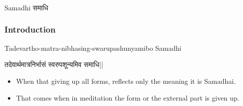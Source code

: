 \begin{frame}[fragile]\frametitle{}
\begin{center}
{\Large Samadhi समाधि}
\end{center}
\end{frame}

\begin{frame}[fragile]\frametitle{Introduction}

Tadevartho-matra-nibhasing-swarupashunyamibo Samadhi

तदेवार्थमात्रनिर्भासं स्वरुपशून्यमिव समाधि||

	\begin{itemize}
	\item When that giving up all forms, 
reflects  only  the  meaning  it  is 
Samadhai. 
	\item That comes when in 
meditation  the  form  or  the 
external part is given up.
	\end{itemize}

\end{frame}
